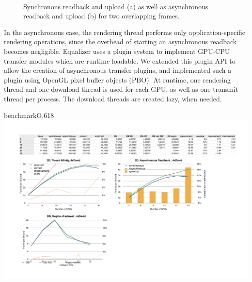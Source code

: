 \begin{figure}[ht]\center
  \\
  \caption{Synchronous readback and upload (a) as well as
    asynchronous readback and upload (b) for two overlapping frames.}
\end{figure}

In the asynchronous case, the rendering thread performs only
application-specific rendering operations, since the overhead of starting an
asynchronous readback becomes negligible. Equalizer uses a plugin system to
implement GPU-CPU transfer modules which are runtime loadable. We extended this
plugin API to allow the creation of asynchronous transfer plugins, and
implemented such a plugin using OpenGL pixel buffer objects (PBO). At runtime,
one rendering thread and one download thread is used for each GPU, as well as
one transmit thread per process. The download threads are created lazy, when
needed.

\begin{wrapfloat}{benchmark}{O}{.618\textwidth}
 \includegraphics[width=.618\textwidth]{results/async}
 {\caption{\label{rAsync}Asynchronous Compositing Sort-First Rendering}}
\end{wrapfloat}

